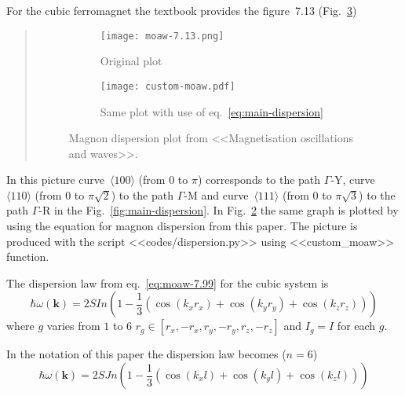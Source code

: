     For the cubic ferromagnet the textbook provides the figure~7.13 (Fig.~\ref{fig:moaw-7.13})
    \begin{quote}
        \begin{figure}[H]
            \centering
            \begin{subfigure}[b]{0.49\textwidth}
                \centering
                \texttt{[image: moaw-7.13.png]}
                \caption{Original plot}
                \label{fig:moaw-7.13-original}
            \end{subfigure}
            \hfill
            \begin{subfigure}[b]{0.49\textwidth}
                \centering
                \texttt{[image: custom-moaw.pdf]}
                \caption{Same plot with use of eq.~\eqref{eq:main-dispersion}}
                \label{fig:moaw-7.13-custom}
            \end{subfigure}
            \hfill
            \caption{Magnon dispersion plot from <<Magnetisation oscillations and waves>>.}
            \label{fig:moaw-7.13}
        \end{figure}
    \end{quote}
    In this picture curve~$\langle 100\rangle$ (from $0$ to $\pi$) corresponds to the path $\Gamma$-Y, 
    curve~$\langle 110\rangle$ (from $0$ to $\pi\sqrt{2}$) to the path $\Gamma$-M and
    curve~$\langle 111\rangle$ (from $0$ to $\pi\sqrt{3}$) to the path $\Gamma$-R 
    in the Fig.~\ref{fig:main-dispersion}. In Fig.~\ref{fig:moaw-7.13-custom} the same graph is plotted by using the equation for magnon dispersion from this paper. 
    The picture is produced with the script <<codes/dispersion.py>> using <<custom\_moaw>> function.

    The dispersion law from eq.~\ref{eq:moaw-7.99} for the cubic system is
    \begin{equation}
        \hbar\omega(\mathbf{k}) = 2SIn\left(1 - \dfrac{1}{3}\left(\cos(k_xr_x) + \cos(k_yr_y) + \cos(k_zr_z)\right)\right)
    \end{equation}
    where $g$ varies from $1$ to $6$ $r_g \in [r_x, -r_x, r_y, -r_y, r_z, -r_z]$ and $I_g = I$ for each $g$. 

    In the notation of this paper the dispersion law becomes ($n = 6$)
    \begin{equation}
        \hbar\omega(\mathbf{k}) = 2SJn\left(1 - \dfrac{1}{3}\left(\cos(k_xl) + \cos(k_yl) + \cos(k_zl)\right)\right)
    \end{equation}

